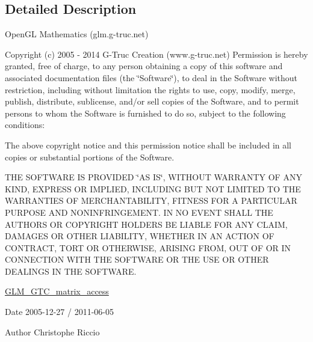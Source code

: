 \subsection{Detailed Description}
Open\+GL Mathematics (glm.\+g-\/truc.\+net)

Copyright (c) 2005 -\/ 2014 G-\/\+Truc Creation (www.\+g-\/truc.\+net) Permission is hereby granted, free of charge, to any person obtaining a copy of this software and associated documentation files (the \char`\"{}\+Software\char`\"{}), to deal in the Software without restriction, including without limitation the rights to use, copy, modify, merge, publish, distribute, sublicense, and/or sell copies of the Software, and to permit persons to whom the Software is furnished to do so, subject to the following conditions\+:

The above copyright notice and this permission notice shall be included in all copies or substantial portions of the Software.

T\+HE S\+O\+F\+T\+W\+A\+RE IS P\+R\+O\+V\+I\+D\+ED \char`\"{}\+A\+S I\+S\char`\"{}, W\+I\+T\+H\+O\+UT W\+A\+R\+R\+A\+N\+TY OF A\+NY K\+I\+ND, E\+X\+P\+R\+E\+SS OR I\+M\+P\+L\+I\+ED, I\+N\+C\+L\+U\+D\+I\+NG B\+UT N\+OT L\+I\+M\+I\+T\+ED TO T\+HE W\+A\+R\+R\+A\+N\+T\+I\+ES OF M\+E\+R\+C\+H\+A\+N\+T\+A\+B\+I\+L\+I\+TY, F\+I\+T\+N\+E\+SS F\+OR A P\+A\+R\+T\+I\+C\+U\+L\+AR P\+U\+R\+P\+O\+SE A\+ND N\+O\+N\+I\+N\+F\+R\+I\+N\+G\+E\+M\+E\+NT. IN NO E\+V\+E\+NT S\+H\+A\+LL T\+HE A\+U\+T\+H\+O\+RS OR C\+O\+P\+Y\+R\+I\+G\+HT H\+O\+L\+D\+E\+RS BE L\+I\+A\+B\+LE F\+OR A\+NY C\+L\+A\+IM, D\+A\+M\+A\+G\+ES OR O\+T\+H\+ER L\+I\+A\+B\+I\+L\+I\+TY, W\+H\+E\+T\+H\+ER IN AN A\+C\+T\+I\+ON OF C\+O\+N\+T\+R\+A\+CT, T\+O\+RT OR O\+T\+H\+E\+R\+W\+I\+SE, A\+R\+I\+S\+I\+NG F\+R\+OM, O\+UT OF OR IN C\+O\+N\+N\+E\+C\+T\+I\+ON W\+I\+TH T\+HE S\+O\+F\+T\+W\+A\+RE OR T\+HE U\+SE OR O\+T\+H\+ER D\+E\+A\+L\+I\+N\+GS IN T\+HE S\+O\+F\+T\+W\+A\+RE.

\hyperlink{group__gtc__matrix__access}{G\+L\+M\+\_\+\+G\+T\+C\+\_\+matrix\+\_\+access}

\begin{DoxyDate}{Date}
2005-\/12-\/27 / 2011-\/06-\/05 
\end{DoxyDate}
\begin{DoxyAuthor}{Author}
Christophe Riccio 
\end{DoxyAuthor}
